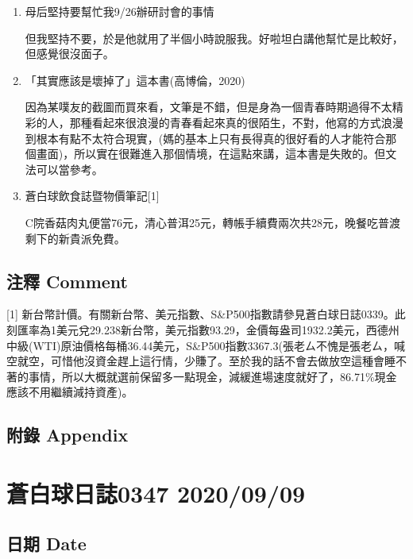 \documentclass[
]{article}
\begin{document}
\begin{enumerate}
\def\labelenumi{\arabic{enumi}.}
\item
  母后堅持要幫忙我9/26辦研討會的事情

  但我堅持不要，於是他就用了半個小時說服我。好啦坦白講他幫忙是比較好，但感覺很沒面子。
\item
  「其實應該是壞掉了」這本書(高博倫，2020)

  因為某噗友的截圖而買來看，文筆是不錯，但是身為一個青春時期過得不太精彩的人，那種看起來很浪漫的青春看起來真的很陌生，不對，他寫的方式浪漫到根本有點不太符合現實，(媽的基本上只有長得真的很好看的人才能符合那個畫面)，所以實在很難進入那個情境，在這點來講，這本書是失敗的。但文法可以當參考。
\item
  蒼白球飲食誌暨物價筆記{[}1{]}

  C院香菇肉丸便當76元，清心普洱25元，轉帳手續費兩次共28元，晚餐吃普渡剩下的新貴派免費。
\end{enumerate}

\hypertarget{ux6ce8ux91cb-comment-7}{%
\subsection{注釋 Comment}\label{ux6ce8ux91cb-comment-7}}

{[}1{]}
新台幣計價。有關新台幣、美元指數、S\&P500指數請參見蒼白球日誌0339。此刻匯率為1美元兌29.238新台幣，美元指數93.29，金價每盎司1932.2美元，西德州中級(WTI)原油價格每桶36.44美元，S\&P500指數3367.3(張老ㄙ不愧是張老ㄙ，喊空就空，可惜他沒資金趕上這行情，少賺了。至於我的話不會去做放空這種會睡不著的事情，所以大概就選前保留多一點現金，減緩進場速度就好了，86.71\%現金應該不用繼續減持資產)。

\hypertarget{ux9644ux9304-appendix-7}{%
\subsection{附錄 Appendix}\label{ux9644ux9304-appendix-7}}

\hypertarget{ux84bcux767dux7403ux65e5ux8a8c0347-20200909}{%
\section{蒼白球日誌0347
2020/09/09}\label{ux84bcux767dux7403ux65e5ux8a8c0347-20200909}}

\hypertarget{ux65e5ux671f-date-8}{%
\subsection{日期 Date}\label{ux65e5ux671f-date-8}}
\end{document}
